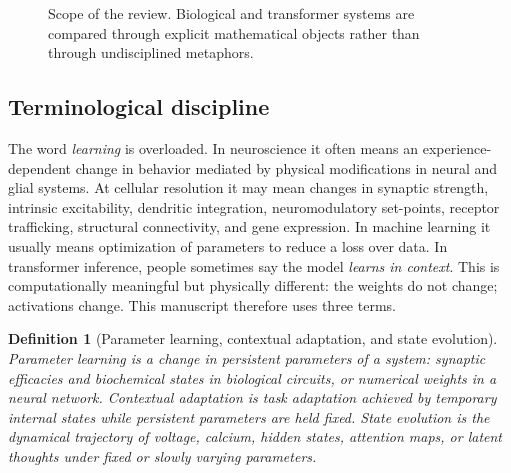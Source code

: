 \documentclass[11pt]{article}
\newtheorem{definition}{Definition}[section]
\newcommand{\1}{\mathbf{1}}
\begin{document}
\begin{figure}[H]
\centering
{}
\caption{Scope of the review. Biological and transformer systems are compared through explicit mathematical objects rather than through undisciplined metaphors.}
\label{fig:scope}
\end{figure}

\subsection{Terminological discipline}

The word \emph{learning} is overloaded. In neuroscience it often means an experience-dependent change in behavior mediated by physical modifications in neural and glial systems. At cellular resolution it may mean changes in synaptic strength, intrinsic excitability, dendritic integration, neuromodulatory set-points, receptor trafficking, structural connectivity, and gene expression. In machine learning it usually means optimization of parameters to reduce a loss over data. In transformer inference, people sometimes say the model \emph{learns in context}. This is computationally meaningful but physically different: the weights do not change; activations change. This manuscript therefore uses three terms.

\begin{definition}[Parameter learning, contextual adaptation, and state evolution]
\emph{Parameter learning} is a change in persistent parameters of a system: synaptic efficacies and biochemical states in biological circuits, or numerical weights in a neural network. \emph{Contextual adaptation} is task adaptation achieved by temporary internal states while persistent parameters are held fixed. \emph{State evolution} is the dynamical trajectory of voltage, calcium, hidden states, attention maps, or latent thoughts under fixed or slowly varying parameters.
\end{definition}
\end{document}

